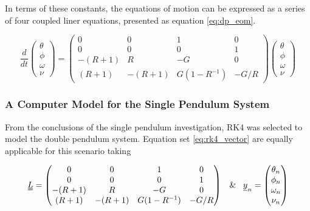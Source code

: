 \documentclass[11pt]{article}
\begin{document}
In terms of these constants, the equations of motion can be expressed as a series of four coupled liner equations, presented as equation \ref{eq:dp_eom}.

\begin{equation}\label{eq:dp_eom}	
\frac{d}{dt} \begin{pmatrix} \theta \\ \phi \\ \omega \\ \nu \end{pmatrix} = 
	\begin{pmatrix}
		0 & 0 & 1 & 0 \\
		0 & 0 & 0 & 1 \\
		-(R+1) & R & -G & 0 \\
		(R+1) & -(R+1) & G(1-R^{-1}) & -G/R
	\end{pmatrix}
	\begin{pmatrix} \theta \\ \phi \\ \omega \\ \nu \end{pmatrix}
\end{equation}

\subsubsection*{A Computer Model for the Single Pendulum System}

From the conclusions of the single pendulum investigation, RK4 was selected to model the double pendulum system. Equation set \ref{eq:rk4_vector} are equally applicable for this scenario taking

\begin{equation} \nonumber
\begin{centering}
\uuline{L} = \begin{pmatrix}
		0 & 0 & 1 & 0 \\
		0 & 0 & 0 & 1 \\
		-(R+1) & R & -G & 0 \\
		(R+1) & -(R+1) & G(1-R^{-1}) & -G/R
	\end{pmatrix} \;\;\; \text{\&} \;\;\; \underline{y}_{n} = \begin{pmatrix} \theta_{n} \\ \phi_{n} \\ \omega_{n} \\ \nu_{n} \end{pmatrix}
\end{centering}
\end{equation}
\end{document}
